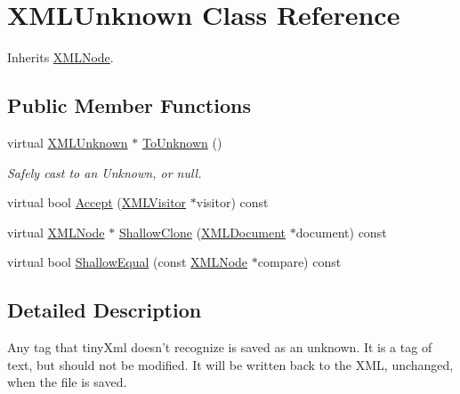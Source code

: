 \hypertarget{classtinyxml2_1_1_x_m_l_unknown}{\section{X\-M\-L\-Unknown Class Reference}
\label{classtinyxml2_1_1_x_m_l_unknown}
}


Inherits \hyperlink{classtinyxml2_1_1_x_m_l_node}{X\-M\-L\-Node}.

\subsection*{Public Member Functions}
\begin{DoxyCompactItemize}
\item 
\hypertarget{classtinyxml2_1_1_x_m_l_unknown_aa9fa4034089ded1476d7994093c8d3a2}{virtual \hyperlink{classtinyxml2_1_1_x_m_l_unknown}{X\-M\-L\-Unknown} $\ast$ \hyperlink{classtinyxml2_1_1_x_m_l_unknown_aa9fa4034089ded1476d7994093c8d3a2}{To\-Unknown} ()}\label{classtinyxml2_1_1_x_m_l_unknown_aa9fa4034089ded1476d7994093c8d3a2}

\begin{DoxyCompactList}\small\item\em Safely cast to an Unknown, or null. \end{DoxyCompactList}\item 
virtual bool \hyperlink{classtinyxml2_1_1_x_m_l_unknown_a66d46e7527ec62912b49400b27137eba}{Accept} (\hyperlink{classtinyxml2_1_1_x_m_l_visitor}{X\-M\-L\-Visitor} $\ast$visitor) const 
\item 
virtual \hyperlink{classtinyxml2_1_1_x_m_l_node}{X\-M\-L\-Node} $\ast$ \hyperlink{classtinyxml2_1_1_x_m_l_unknown_a4267351368d51803f98480981d622c00}{Shallow\-Clone} (\hyperlink{classtinyxml2_1_1_x_m_l_document}{X\-M\-L\-Document} $\ast$document) const 
\item 
virtual bool \hyperlink{classtinyxml2_1_1_x_m_l_unknown_aa4032d1d6b59a8392a1dc6a081618bbc}{Shallow\-Equal} (const \hyperlink{classtinyxml2_1_1_x_m_l_node}{X\-M\-L\-Node} $\ast$compare) const 
\end{DoxyCompactItemize}


\subsection{Detailed Description}
Any tag that tiny\-Xml doesn't recognize is saved as an unknown. It is a tag of text, but should not be modified. It will be written back to the X\-M\-L, unchanged, when the file is saved.

